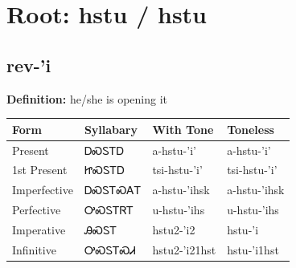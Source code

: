 \documentclass{article}%
\begin{document}
%
\normalsize%
\section*{Root: hstu / hstu}%
\subsection*{rev-'i}%
\textbf{Definition: }%
he/she is opening it%
\\[0.5em]%
\begin{tabular}{|l|l|l|l|}%
\hline%
\textbf{Form}&\textbf{Syllabary}&\textbf{With Tone}&\textbf{Toneless}\\%
\hline%
Present&ᎠᏍᏚᎢᎠ&a{-}hstu{-}'i'&a{-}hstu{-}'i'\\%
1st Present&ᏥᏍᏚᎢᎠ&tsi{-}hstu{-}'i'&tsi{-}hstu{-}'i'\\%
Imperfective&ᎠᏍᏚᎢᏍᎪᎢ&a{-}hstu{-}'ihsk&a{-}hstu{-}'ihsk\\%
Perfective&ᎤᏍᏚᎢᏒᎢ&u{-}hstu{-}'ihs&u{-}hstu{-}'ihs\\%
Imperative&ᎯᏍᏚᎢ&hstu2{-}'i2&hstu{-}'i\\%
Infinitive&ᎤᏍᏚᎢᏍᏗ&hstu2{-}'i21hst&hstu{-}'i1hst\\%
\hline%
\end{tabular}%
\\[1em]%
\end{document}
